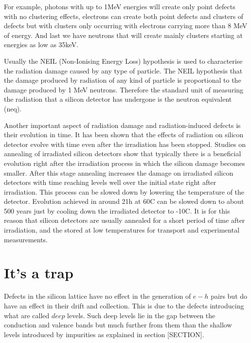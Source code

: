For example, photons with up to 1MeV energies will create only point defects with no clustering effects, electrons can create both point defects and clusters of defects but with clusters only occurring with electrons carrying more than 8 MeV of energy. And last we have neutrons that will create mainly clusters starting at energies as low as 35keV. 

Usually the NEIL (Non-Ionising Energy Loss) hypothesis is used to characterise the radiation damage caused by any type of particle. The NEIL hypothesis that the damage produced by radiation of any kind of particle is proportional to the damage produced by 1 MeV neutrons. Therefore the standard unit of measuring the radiation that a silicon detector has undergone is the neutron equivalent (neq).

Another important aspect of radiation damage and radiation-induced defects is their evolution in time. It has been shown that the effects of radiation on silicon detector evolve with time even after the irradiation has been stopped. Studies on annealing of irradiated silicon detectors show that typically there is a beneficial evolution right after the irradiation process in which the silicon damage becomes smaller. After this stage annealing increases the damage on irradiated silicon detectors with time reaching levels well over the initial state right after irradiation. This process can be slowed down by lowering the temperature of the detector. Evolution achieved in around 21h at 60C can be slowed down to about 500 years just by cooling down the irradiated detector to -10C. It is for this reason that silicon detectors are usually annealed for a short period of time after irradiation, and the stored at low temperatures for transport and experimental measurements.

\section{It's a trap}

Defects in the silicon lattice have no effect in the generation of $e-h$ pairs but do have an effect in their drift and collection. This is due to the defects introducing what are called $deep$ levels. Such deep levels lie in the gap between the conduction and valence bands but much further from them than the shallow levels introduced by impurities as explained in section [SECTION].

